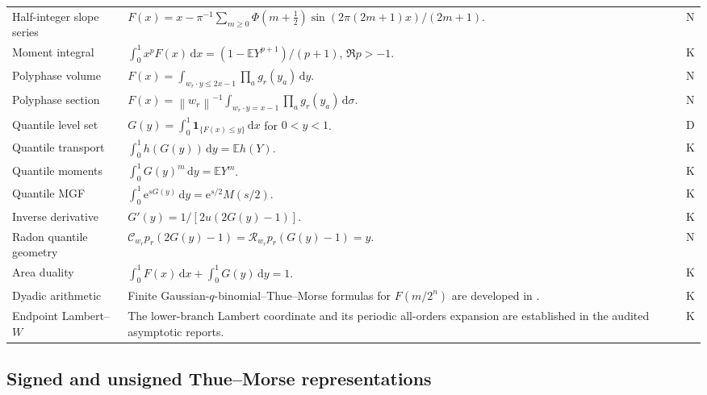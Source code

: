 \documentclass[11pt,oneside]{article}
\numberwithin{equation}{section}
\theoremstyle{definition}
\theoremstyle{remark}
\newcommand{\E}{\mathbb E}
\newcommand{\dd}{\,\mathrm d}
\newcommand{\e}{\mathrm e}
\newcommand{\norm}[1]{\left\lVert#1\right\rVert}
\newcommand{\cC}{\mathcal C}
\newcommand{\cR}{\mathcal R}
\newcommand{\statusknown}{\textcolor{deepviolet}{\textsf{K}}}
\newcommand{\statusderived}{\textcolor{derivedblue}{\textsf{D}}}
\newcommand{\statusnew}{\textcolor{provedgreen}{\textsf{N}}}
\begin{document}
\begin{longtable}{@{}p{}p{}p{}@{}}
Half-integer slope series &
$F(x)=x-\pi^{-1}\sum_{m\ge0}\Phi(m+\tfrac12)
\sin(2\pi(2m+1)x)/(2m+1)$. & \statusnew\\
Moment integral &
$\int_0^1x^pF(x)\dd x=(1-\E Y^{p+1})/(p+1)$, $\Re p>-1$. & \statusknown\\
Polyphase volume &
$F(x)=\int_{w_r\cdot y\le2x-1}\prod_ag_r(y_a)\dd y$. & \statusnew\\
Polyphase section &
$F(x)=\norm{w_r}^{-1}\int_{w_r\cdot y=x-1}\prod_ag_r(y_a)\dd\sigma$. & \statusnew\\
Quantile level set &
$G(y)=\int_0^1\mathbf1_{\{F(x)\le y\}}\dd x$ for $0<y<1$. & \statusderived\\
Quantile transport &
$\int_0^1h(G(y))\dd y=\E h(Y)$. & \statusknown\\
Quantile moments &
$\int_0^1G(y)^m\dd y=\E Y^m$. & \statusknown\\
Quantile MGF &
$\int_0^1\e^{sG(y)}\dd y=\e^{s/2}M(s/2)$. & \statusknown\\
Inverse derivative &
$G'(y)=1/[2u(2G(y)-1)]$. & \statusknown\\
Radon quantile geometry &
$\cC_{w_r}p_r(2G(y)-1)=\cR_{w_r}p_r(G(y)-1)=y$. & \statusnew\\
Area duality &
$\int_0^1F(x)\dd x+\int_0^1G(y)\dd y=1$. & \statusknown\\
Dyadic arithmetic &
Finite Gaussian-$q$-binomial--Thue--Morse formulas for $F(m/2^n)$ are developed in \cite{repoPrimary,repoAtlas}. & \statusknown\\
Endpoint Lambert--$W$ &
The lower-branch Lambert coordinate and its periodic all-orders expansion are established in the audited asymptotic reports. & \statusknown\\
\bottomrule
\end{longtable}

\subsection{Signed and unsigned Thue--Morse representations}
\end{document}
